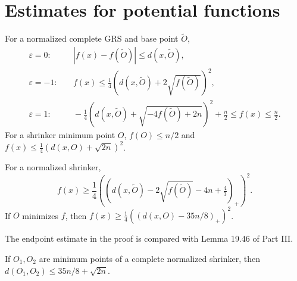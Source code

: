 \section{Estimates for potential functions}

\begin{corollary}
\label{cor:chow-iv-potential-bounds}
For a normalized complete GRS and base point $\widetilde O$,
\begin{align*}
\varepsilon=0:&\quad |f(x)-f(\widetilde O)|\le d(x,\widetilde O),\\
\varepsilon=-1:&\quad f(x)\le\tfrac14(d(x,\widetilde O)+2\sqrt{f(\widetilde O)})^2,\\
\varepsilon=1:&\quad -\tfrac14(d(x,\widetilde O)+\sqrt{-4f(\widetilde O)+2n})^2+\tfrac n2
\le f(x)\le\tfrac n2.
\end{align*}
For a shrinker minimum point $O$, $f(O)\le n/2$ and
$f(x)\le\frac14(d(x,O)+\sqrt{2n})^2$.
\end{corollary}

\begin{theorem}
\label{thm:chow-iv-potential-lower-bound}
For a normalized shrinker,
\[
f(x)\ge\frac14\left((d(x,\widetilde O)-2\sqrt{f(\widetilde O)}-4n+\tfrac43)_+\right)^2.
\]
If $O$ minimizes $f$, then
$f(x)\ge\frac14((d(x,O)-35n/8)_+)^2$.
\end{theorem}

\begin{remark}
\label{rem:chow-iv-potential-part-iii-comparison}
The endpoint estimate in the proof is compared with Lemma 19.46 of Part III.
\end{remark}

\begin{corollary}
\label{cor:chow-iv-potential-minima-distance}
If $O_1,O_2$ are minimum points of a complete normalized shrinker, then
$d(O_1,O_2)\le35n/8+\sqrt{2n}$.
\end{corollary}

